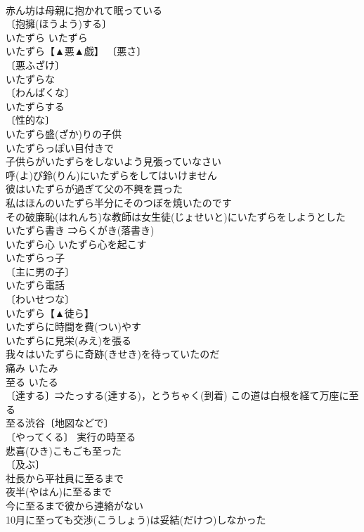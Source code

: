 \documentclass[8pt]{extreport}
\begin{document}
\begin{CJK}{UTF8}{min}
\\	赤ん坊は母親に抱かれて眠っている 
\\	〔抱擁(ほうよう)する〕
\\	いたずら	いたずら	
\\	いたずら【▲悪▲戯】 〔悪さ〕
\\	〔悪ふざけ〕
\\	いたずらな 
\\	〔わんぱくな〕
\\	いたずらする 
\\	〔性的な〕
\\	いたずら盛(ざか)りの子供 
\\	いたずらっぽい目付きで 
\\	子供らがいたずらをしないよう見張っていなさい 
\\	呼(よ)び鈴(りん)にいたずらをしてはいけません 
\\	彼はいたずらが過ぎて父の不興を買った 
\\	私はほんのいたずら半分にそのつぼを焼いたのです 
\\	その破廉恥(はれんち)な教師は女生徒(じょせいと)にいたずらをしようとした 
\\	いたずら書き ⇒らくがき(落書き) 
\\	いたずら心 いたずら心を起こす 
\\	いたずらっ子 
\\	〔主に男の子〕
\\	いたずら電話 
\\	〔わいせつな〕
\\	いたずら【▲徒ら】 
\\	いたずらに時間を費(つい)やす 
\\	いたずらに見栄(みえ)を張る 
\\	我々はいたずらに奇跡(きせき)を待っていたのだ 
\\	痛み	いたみ	
\\	至る	いたる	
\\	〔達する〕⇒たっする(達する)，とうちゃく(到着) この道は白根を経て万座に至る 
\\	至る渋谷〔地図などで〕 
\\	〔やってくる〕 実行の時至る 
\\	悲喜(ひき)こもごも至った 
\\	〔及ぶ〕
\\	社長から平社員に至るまで 
\\	夜半(やはん)に至るまで 
\\	今に至るまで彼から連絡がない 
\\	10月に至っても交渉(こうしょう)は妥結(だけつ)しなかった 

\end{CJK}
\end{document}
